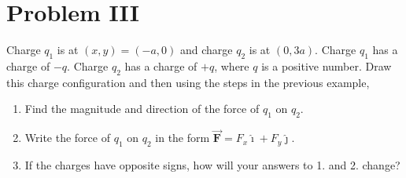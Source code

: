 \documentclass{article}
\newcommand{\ihat}[0]{\hat{\boldsymbol{\imath}}}
\newcommand{\jhat}[0]{\hat{\boldsymbol{\jmath}}}
\newcommand{\bfvec}[1]{\vec{\mathbf{#1}}}
\begin{document}
\section{Problem III}

Charge $q_1$ is at $(x,y)=(-a,0)$ and charge $q_2$ is at $(0, 3a)$. Charge $q_1$ has a charge of $-q$. Charge $q_2$ has a charge of $+q$, where $q$ is a positive number. Draw this charge configuration and then using the steps in the previous example,

\begin{enumerate}

  \item Find the magnitude and direction of the force of $q_1$ on $q_2$.

  \item Write the force of $q_1$ on $q_2$ in the form $\bfvec{F}=F_x\ihat + F_y\jhat$.

  \item If the charges have opposite signs, how will your answers to 1. and 2. change?

\end{enumerate}


\end{document}
